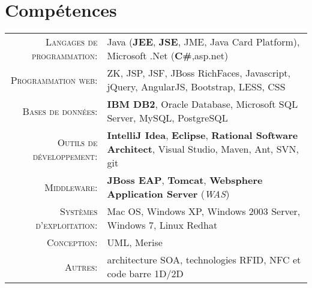 \section{\texorpdfstring{\color{Blue}Compétences}{Compétences}}
\renewcommand{\arraystretch}{1.1}


	\begin{tabular}{>{\small}r>{\small}p{13cm}} 
		\textsc{Langages de programmation:}  &   Java (\textbf{JEE}, \textbf{JSE}, JME, Java Card Platform), Microsoft .Net (\textbf{C\#},asp.net)\\ 
		\textsc{Programmation web:}               &   ZK, JSP, JSF, JBoss RichFaces, Javascript, jQuery, AngularJS, Bootstrap, LESS, CSS\\ 
		\textsc{Bases de données:}                  &   \textbf{IBM DB2}, Oracle Database, Microsoft SQL Server, MySQL, PostgreSQL \\ 
		\textsc{Outils de développement:}	  &   \textbf {IntelliJ Idea}, \textbf {Eclipse}, \textbf{Rational Software Architect}, Visual Studio, Maven, Ant, SVN, git\\
		\textsc{Middleware:}				        &   \textbf{JBoss EAP}, \textbf{Tomcat}, \textbf{Websphere Application Server} (\emph{WAS})\\ 
		\textsc{Systèmes d'exploitation:}	        &   Mac OS, Windows XP, Windows 2003 Server, Windows 7, Linux Redhat\\ 
		\textsc{Conception:}				        &   UML, Merise\\
		\textsc{Autres:}					        &   architecture SOA, technologies RFID, NFC et code barre 1D/2D
	\end{tabular}